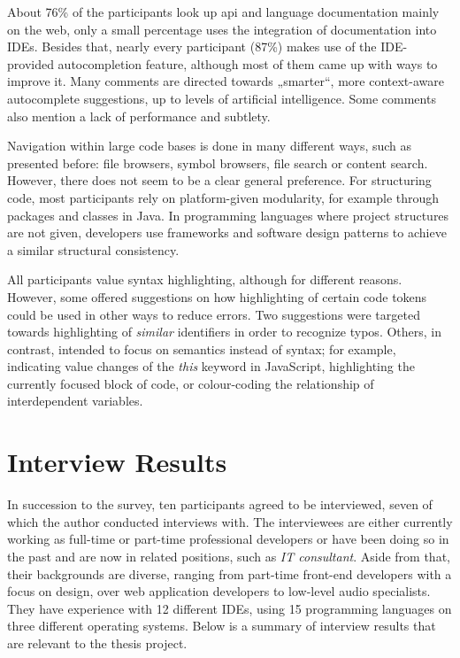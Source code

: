 About 76\% of the participants look up \ac{api} and language
documentation mainly on the web, only a small percentage uses the
integration of documentation into IDEs. Besides that, nearly every
participant (87\%) makes use of the IDE-provided autocompletion feature,
although most of them came up with ways to improve it. Many comments are
directed towards „smarter“, more context-aware autocomplete suggestions,
up to levels of artificial intelligence. Some comments also mention a
lack of performance and subtlety.

Navigation within large code bases is done in many different ways, such
as presented before: file browsers, symbol browsers, file search or
content search. However, there does not seem to be a clear general
preference. For structuring code, most participants rely on
platform-given modularity, for example through packages and classes in
Java. In programming languages where project structures are not given,
developers use frameworks and software design patterns to achieve a
similar structural consistency.

All participants value syntax highlighting, although for different
reasons. However, some offered suggestions on how highlighting of
certain code tokens could be used in other ways to reduce errors. Two
suggestions were targeted towards highlighting of \emph{similar}
identifiers in order to recognize typos. Others, in contrast, intended
to focus on semantics instead of syntax; for example, indicating value
changes of the \emph{this} keyword in JavaScript, highlighting the
currently focused block of code, or colour-coding the relationship of
interdependent variables.

\section{Interview Results}\label{interview-results}

In succession to the survey, ten participants agreed to be interviewed,
seven of which the author conducted interviews with. The interviewees
are either currently working as full-time or part-time professional
developers or have been doing so in the past and are now in related
positions, such as \emph{IT consultant}. Aside from that, their
backgrounds are diverse, ranging from part-time front-end developers
with a focus on design, over web application developers to low-level
audio specialists. They have experience with 12 different IDEs, using 15
programming languages on three different operating systems. Below is a
summary of interview results that are relevant to the thesis project.

